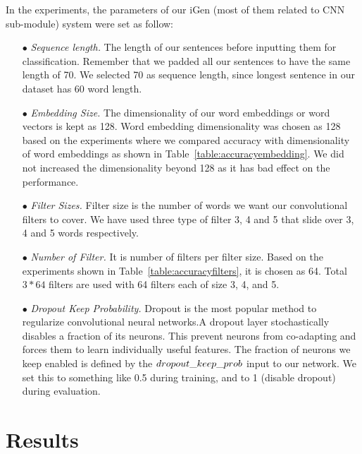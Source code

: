 In the experiments, the parameters of our iGen (most of them related to CNN sub-module) system were set as follow:
\begin{itemize}
 \item[$\bullet$ ] \textit{Sequence length.} The length of our sentences before inputting them for classification. Remember that we padded all our sentences to have the same length of 70. We selected 70 as sequence length, since longest sentence in our dataset has 60 word length.
  \item[$\bullet$ ] \textit{Embedding Size.} The dimensionality of our word embeddings or word vectors is kept as 128. Word embedding dimensionality was chosen as 128 based on the experiments where we compared accuracy with dimensionality of word embeddings as shown in Table~\ref{table:accuracyembedding}. We did not increased the dimensionality beyond 128 as it has bad effect on the performance.   
  \item[$\bullet$ ] \textit{Filter Sizes.} Filter size is the number of words we want our convolutional filters to cover. We have used three type of filter 3, 4 and 5 that slide over 3, 4 and 5 words respectively. 
  \item[$\bullet$ ] \textit{Number of Filter.} It is number of filters per filter size. Based on the experiments shown in Table~\ref{table:accuracyfilters}, it is chosen as 64. Total $3*64$ filters are used with 64 filters each of size 3, 4, and 5.
  \item[$\bullet$ ] \textit{Dropout Keep Probability.} Dropout is the most popular method to regularize convolutional neural networks.A dropout layer stochastically disables a fraction of its neurons. This prevent neurons from co-adapting and forces them to learn individually useful features. The fraction of neurons we keep enabled is defined by the $dropout\char`_keep\char`_prob$ input to our network. We set this to something like 0.5 during training, and to 1 (disable dropout) during evaluation.
  
\end{itemize}

\section{Results}

